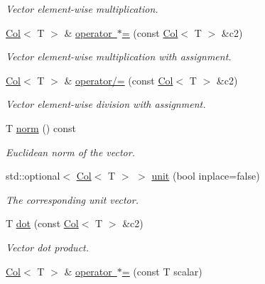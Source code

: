 \begin{DoxyCompactItemize}
\begin{DoxyCompactList}\small\item\em Vector element-\/wise multiplication. \end{DoxyCompactList}\item 
\mbox{\hyperlink{classtao_1_1deprecated_1_1_col}{Col}}$<$ T $>$ \& \mbox{\hyperlink{classtao_1_1deprecated_1_1_col_a2c6cb515a46f76797dffdac251f4e3fa}{operator $\ast$=}} (const \mbox{\hyperlink{classtao_1_1deprecated_1_1_col}{Col}}$<$ T $>$ \&c2)
\begin{DoxyCompactList}\small\item\em Vector element-\/wise multiplication with assignment. \end{DoxyCompactList}\item 
\mbox{\hyperlink{classtao_1_1deprecated_1_1_col}{Col}}$<$ T $>$ \& \mbox{\hyperlink{classtao_1_1deprecated_1_1_col_a7efce49157e7566d092dfe665dfaefd7}{operator/=}} (const \mbox{\hyperlink{classtao_1_1deprecated_1_1_col}{Col}}$<$ T $>$ \&c2)
\begin{DoxyCompactList}\small\item\em Vector element-\/wise division with assignment. \end{DoxyCompactList}\item 
T \mbox{\hyperlink{classtao_1_1deprecated_1_1_col_a8501c1119f984d66f4a9172fa079bf6a}{norm}} () const
\begin{DoxyCompactList}\small\item\em Euclidean norm of the vector. \end{DoxyCompactList}\item 
std\+::optional$<$ \mbox{\hyperlink{classtao_1_1deprecated_1_1_col}{Col}}$<$ T $>$ $>$ \mbox{\hyperlink{classtao_1_1deprecated_1_1_col_ad2cee269711ef1a9eebda2e54035f9f4}{unit}} (bool inplace=false)
\begin{DoxyCompactList}\small\item\em The corresponding unit vector. \end{DoxyCompactList}\item 
T \mbox{\hyperlink{classtao_1_1deprecated_1_1_col_ab1070d68d4b4570bcf7865f91178dd22}{dot}} (const \mbox{\hyperlink{classtao_1_1deprecated_1_1_col}{Col}}$<$ T $>$ \&c2)
\begin{DoxyCompactList}\small\item\em Vector dot product. \end{DoxyCompactList}\item 
\mbox{\hyperlink{classtao_1_1deprecated_1_1_col}{Col}}$<$ T $>$ \& \mbox{\hyperlink{classtao_1_1deprecated_1_1_col_a8074f1bab1ce2042f77de21c6a21867d}{operator $\ast$=}} (const T scalar)

\end{DoxyCompactItemize}
